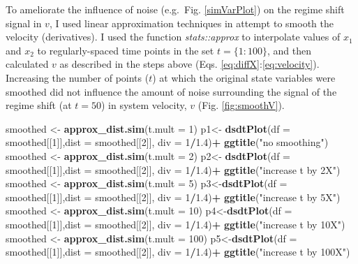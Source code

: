 \documentclass[12pt,twoside,openany]{reedthesis}
\newenvironment{Shaded}{\begin{snugshade}}{\end{snugshade}}
\newcommand{\DataTypeTok}[1]{\textcolor[rgb]{0.13,0.29,0.53}{#1}}
\newcommand{\DecValTok}[1]{\textcolor[rgb]{0.00,0.00,0.81}{#1}}
\newcommand{\FloatTok}[1]{\textcolor[rgb]{0.00,0.00,0.81}{#1}}
\newcommand{\KeywordTok}[1]{\textcolor[rgb]{0.13,0.29,0.53}{\textbf{#1}}}
\newcommand{\NormalTok}[1]{#1}
\newcommand{\OperatorTok}[1]{\textcolor[rgb]{0.81,0.36,0.00}{\textbf{#1}}}
\newcommand{\StringTok}[1]{\textcolor[rgb]{0.31,0.60,0.02}{#1}}
\begin{document}
To ameliorate the influence of noise (e.g.~Fig. \ref{simVarPlot}) on the regime shift signal in \(v\), I used linear approximation techniques in attempt to smooth the velocity (derivatives). I used the function \emph{stats::approx} to interpolate values of \(x_1\) and \(x_2\) to regularly-spaced time points in the set \(t=\{1:100\}\), and then calculated \(v\) as described in the steps above (Eqs. \eqref{eq:diffX}:\eqref{eq:velocity}). Increasing the number of points (\(t\)) at which the original state variables were smoothed did not influence the amount of noise surrounding the signal of the regime shift (at \(t=50\)) in system velocity, \(v\) (Fig. \ref{fig:smoothV}).
\begin{Shaded}
\begin{Highlighting}[]
\NormalTok{smoothed <-}\StringTok{ }\KeywordTok{approx_dist.sim}\NormalTok{(}\DataTypeTok{t.mult =} \DecValTok{1}\NormalTok{)}
\NormalTok{p1<-}\StringTok{ }\KeywordTok{dsdtPlot}\NormalTok{(}\DataTypeTok{df =}\NormalTok{ smoothed[[}\DecValTok{1}\NormalTok{]],}\DataTypeTok{dist =}\NormalTok{ smoothed[[}\DecValTok{2}\NormalTok{]], }\DataTypeTok{div =} \DecValTok{1}\OperatorTok{/}\FloatTok{1.4}\NormalTok{)}\OperatorTok{+}
\StringTok{  }\KeywordTok{ggtitle}\NormalTok{(}\StringTok{"no smoothing"}\NormalTok{)}
\NormalTok{smoothed <-}\StringTok{ }\KeywordTok{approx_dist.sim}\NormalTok{(}\DataTypeTok{t.mult =} \DecValTok{2}\NormalTok{)}
\NormalTok{p2<-}\StringTok{ }\KeywordTok{dsdtPlot}\NormalTok{(}\DataTypeTok{df =}\NormalTok{ smoothed[[}\DecValTok{1}\NormalTok{]],}\DataTypeTok{dist =}\NormalTok{ smoothed[[}\DecValTok{2}\NormalTok{]], }\DataTypeTok{div =} \DecValTok{1}\OperatorTok{/}\FloatTok{1.4}\NormalTok{)}\OperatorTok{+}
\StringTok{  }\KeywordTok{ggtitle}\NormalTok{(}\StringTok{"increase t by 2X"}\NormalTok{)}
\NormalTok{smoothed <-}\StringTok{ }\KeywordTok{approx_dist.sim}\NormalTok{(}\DataTypeTok{t.mult =} \DecValTok{5}\NormalTok{)}
\NormalTok{p3<-}\KeywordTok{dsdtPlot}\NormalTok{(}\DataTypeTok{df =}\NormalTok{ smoothed[[}\DecValTok{1}\NormalTok{]],}\DataTypeTok{dist =}\NormalTok{ smoothed[[}\DecValTok{2}\NormalTok{]], }\DataTypeTok{div =} \DecValTok{1}\OperatorTok{/}\FloatTok{1.4}\NormalTok{)}\OperatorTok{+}
\StringTok{  }\KeywordTok{ggtitle}\NormalTok{(}\StringTok{"increase t by 5X"}\NormalTok{)}
\NormalTok{smoothed <-}\StringTok{ }\KeywordTok{approx_dist.sim}\NormalTok{(}\DataTypeTok{t.mult =} \DecValTok{10}\NormalTok{)}
\NormalTok{p4<-}\KeywordTok{dsdtPlot}\NormalTok{(}\DataTypeTok{df =}\NormalTok{ smoothed[[}\DecValTok{1}\NormalTok{]],}\DataTypeTok{dist =}\NormalTok{ smoothed[[}\DecValTok{2}\NormalTok{]], }\DataTypeTok{div =} \DecValTok{1}\OperatorTok{/}\FloatTok{1.4}\NormalTok{)}\OperatorTok{+}
\StringTok{  }\KeywordTok{ggtitle}\NormalTok{(}\StringTok{"increase t by 10X"}\NormalTok{)}
\NormalTok{smoothed <-}\StringTok{ }\KeywordTok{approx_dist.sim}\NormalTok{(}\DataTypeTok{t.mult =} \DecValTok{100}\NormalTok{)}
\NormalTok{p5<-}\KeywordTok{dsdtPlot}\NormalTok{(}\DataTypeTok{df =}\NormalTok{ smoothed[[}\DecValTok{1}\NormalTok{]],}\DataTypeTok{dist =}\NormalTok{ smoothed[[}\DecValTok{2}\NormalTok{]], }\DataTypeTok{div =} \DecValTok{1}\OperatorTok{/}\FloatTok{1.4}\NormalTok{)}\OperatorTok{+}
\StringTok{  }\KeywordTok{ggtitle}\NormalTok{(}\StringTok{"increase t by 100X"}\NormalTok{)}


\end{Highlighting}
\end{Shaded}
\end{document}
